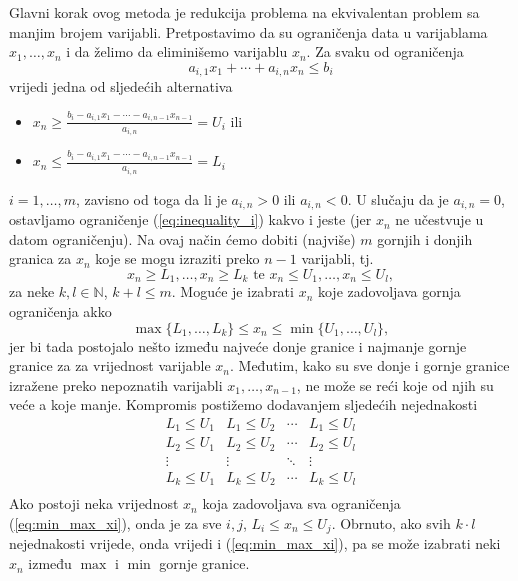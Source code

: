 \documentclass[a4paper, utf8, 11pt, colorlinks]{book}
\begin{document}
 Glavni korak ovog metoda je redukcija problema na ekvivalentan problem sa manjim brojem varijabli. Pretpostavimo da su ograničenja data u varijablama $x_1,\ldots, x_n$ i da želimo da eliminišemo varijablu $x_n$. Za svaku od ograničenja
 \begin{equation}\label{eq:inequality_i}
      a_{i,1} x_1 + \cdots + a_{i,n} x_n \leq b_i
 \end{equation}
 vrijedi jedna od sljedećih alternativa 
 \begin{itemize}
 	 \item  $x_n \geq \frac{b_i - a_{i,1}x_1- \cdots - a_{i, n-1} x_{n-1} }{a_{i,n}}=U_i$ ili 
 	 \item   $x_n \leq \frac{b_i - a_{i,1}x_1- \cdots - a_{i, n-1} x_{n-1} }{a_{i,n}}=L_i$
 \end{itemize}
 $i=1,\ldots, m$, zavisno od toga da li je $a_{i,n} >0$ ili $a_{i,n} <0$. U slučaju da je $a_{i,n} = 0$,  ostavljamo  ograničenje (\ref{eq:inequality_i}) kakvo i jeste (jer $x_n$ ne učestvuje u datom ograničenju). Na ovaj način ćemo dobiti (najviše) $m$ gornjih i donjih granica za $x_n$ koje se mogu izraziti preko $n-1$ varijabli, tj. 
 $$  x_n \geq L_1, \ldots, x_n\geq L_k \mbox{ te }  x_n \leq U_1, \ldots, x_n \leq U_l,$$
  za neke $k,l \in \mathbb{N}$, $k+l \leq m$.
 Moguće je izabrati $x_n$ koje zadovoljava gornja ograničenja akko 
 \begin{equation}\label{eq:min_max_xi}
     \max\{L_1,\ldots, L_k \} \leq x_n \leq \min \{ U_1, \ldots, U_l \},
   \end{equation}
 jer bi tada postojalo nešto između najveće donje granice i najmanje gornje granice za za vrijednost varijable $x_n$. Međutim, kako su sve donje i gornje granice izražene preko nepoznatih varijabli $x_1, \ldots, x_{n-1}$, ne može se reći koje od njih su veće a koje manje. Kompromis postižemo dodavanjem  sljedećih nejednakosti 
 $$\begin{array}{cccc}
       L_1 \leq U_1 & L_1 \leq U_2   &  \cdots   & L_1 \leq U_l \\
       L_2 \leq U_1 & L_2  \leq U_2  &  \cdots   & L_2 \leq U_l \\
       \vdots       &     \vdots     &   \ddots  & \vdots       \\
       L_k \leq U_1 &  L_k \leq U_2  &   \cdots  & L_k \leq U_l \\
 \end{array}$$ 
Ako postoji neka vrijednost  $x_n$ koja zadovoljava sva ograničenja (\ref{eq:min_max_xi}), onda je za sve $i,j$, 
$L_i \leq x_n \leq U_j$. Obrnuto, ako svih $k \cdot l$ nejednakosti vrijede, onda vrijedi i (\ref{eq:min_max_xi}), pa se može izabrati neki $x_n$ između $\max$ i $\min$ gornje granice. 
\end{document}
